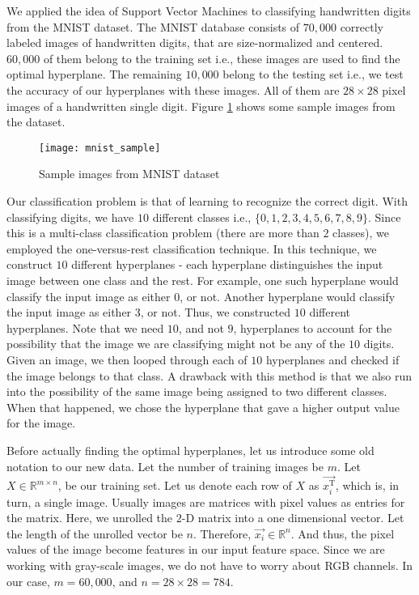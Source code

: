 
We applied the idea of Support Vector Machines to classifying handwritten digits from the MNIST dataset\cite{mnist}. The MNIST database consists of $70,000$ correctly labeled images of handwritten digits, that are size-normalized and centered. $60,000$ of them belong to the training set i.e., these images are used to find the optimal hyperplane. The remaining $10,000$ belong to the testing set i.e., we test the accuracy of our hyperplanes with these images. All of them are $28\times28$ pixel images of a handwritten single digit. Figure \ref{fig:mnist} shows some sample images from the dataset.

\begin{figure}[!tb]
	\texttt{[image: mnist\_sample]}
	\centering
	\caption{Sample images from MNIST dataset}
	\label{fig:mnist}
\end{figure}

Our classification problem is that of learning to recognize the correct digit. With classifying digits, we have $10$ different classes i.e., $\{0, 1, 2, 3, 4, 5, 6, 7, 8, 9\}$. Since this is a multi-class classification problem (there are more than $2$ classes), we employed the one-versus-rest classification technique. In this technique, we construct $10$ different hyperplanes - each hyperplane distinguishes the input image between one class and the rest. For example, one such hyperplane would classify the input image as either $0$, or not. Another hyperplane would classify the input image as either $3$, or not. Thus, we constructed $10$ different hyperplanes. Note that we need $10$, and not $9$, hyperplanes to account for the possibility that the image we are classifying might not be any of the $10$ digits. Given an image, we then looped through each of $10$ hyperplanes and checked if the image belongs to that class. A drawback with this method is that we also run into the possibility of the same image being assigned to two different classes. When that happened, we chose the hyperplane that gave a higher output value for the image.

Before actually finding the optimal hyperplanes, let us introduce some old notation to our new data. Let the number of training images be $m$. Let $X\in\mathbb{R}^{m\times n}$, be our training set. Let us denote each row of $X$ as $\vec{x_i^\text{T}}$, which is, in turn, a single image. Usually images are matrices with pixel values as entries for the matrix. Here, we unrolled the $2$-D matrix into a one dimensional vector. Let the length of the unrolled vector be $n$. Therefore, $\vec{x_i}\in\mathbb{R}^{n}$. And thus, the pixel values of the image become features in our input feature space. Since we are working with gray-scale images, we do not have to worry about RGB channels. In our case, $m = 60,000$, and $n = 28\times28 = 784$.

